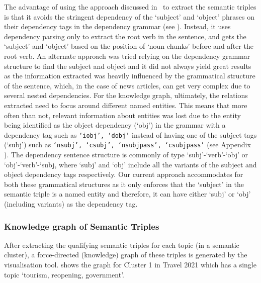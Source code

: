 The advantage of using the approach discussed in~ to extract the semantic triples is that it avoids the stringent dependency of the `subject' and `object' phrases on their dependency tags in the dependency grammar (see ). Instead, it uses dependency parsing only to extract the root verb in the sentence, and gets the `subject' and `object' based on the position of `noun chunks' before and after the root verb. An alternate approach was tried relying on the dependency grammar structure to find the subject and object and it did not always yield great results as the information extracted was heavily influenced by the grammatical structure of the sentence, which, in the case of news articles, can get very complex due to several nested dependencies. For the knowledge graph, ultimately, the relations extracted need to focus around different named entities. This means that more often than not, relevant information about entities was lost due to the entity being identified as the object dependency (`obj') in the grammar with a dependency tag such as \texttt{`iobj', `dobj'} instead of having one of the subject tags (`subj') such as \texttt{`nsubj', `csubj', `nsubjpass',	`csubjpass'} (see Appendix ). The dependency sentence structure is commonly of type `subj'-`verb'-`obj' or `obj'-`verb'-`subj, where `subj' and `obj' include all the variants of the subject and object dependency tags respectively. Our current approach accommodates for both these grammatical structures as it only enforces that the `subject' in the semantic triple is a named entity and therefore, it can have either `subj'  or `obj' (including variants) as the dependency tag.

\subsubsection*{Knowledge graph of Semantic Triples}

After extracting the qualifying semantic triples for each topic (in a semantic cluster), a force-directed (knowledge) graph of these triples is generated by the visualisation tool.  shows the graph for Cluster 1 in Travel 2021 which has a single topic `tourism, reopening, government'. 

\vspace{-1ex}


